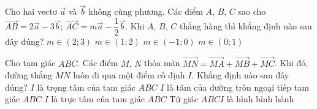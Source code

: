 \begin{ex}%
	Cho hai vectơ $\overrightarrow a $ và $\overrightarrow b $ không cùng phương. Các điểm $ A$, $B$, $C$ sao cho $\overrightarrow{AB}=2\overrightarrow a-3\overrightarrow b$; $\overrightarrow{AC}=m\overrightarrow a-\dfrac{1}{2}\overrightarrow b $. Khi $ A$, $B$, $C$ thẳng hàng thì khẳng định nào sau đây đúng?
	\choice
	{$ m\in\left(2;3\right)$}
	{$ m\in\left(1;2\right)$}
	{$ m\in\left(-1;0\right)$}
	{\True $ m\in\left(0;1\right)$}
\end{ex}

\begin{ex}%
	Cho tam giác $ ABC$. Các điểm $ M,\,N$ thỏa mãn $\overrightarrow{MN}=\overrightarrow{MA}+\overrightarrow{MB}+\overrightarrow{MC}$. Khi đó, đường thẳng $ MN$ luôn đi qua một điểm cố định $ I$. Khẳng định nào sau đây đúng?
	\choice
	{\True $ I$ là trọng tâm của tam giác $ ABC$}
	{$ I$ là tâm của đường tròn ngoại tiếp tam giác $ ABC$}
	{$ I$ là trực tâm của tam giác $ ABC$}
	{Tứ giác $ ABCI$ là hình bình hành}
\end{ex}

